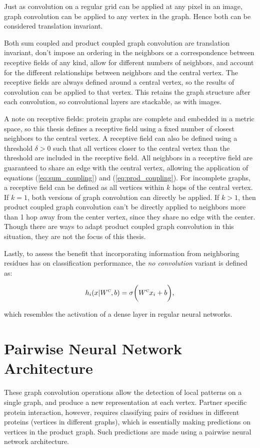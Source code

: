 Just as convolution on a regular grid can be applied at any pixel in an image, graph convolution can be applied to any vertex in the graph.
Hence both can be considered translation invariant.

Both sum coupled and product coupled graph convolution are translation invariant, don't impose an ordering in the neighbors or a correspondence between receptive fields of any kind, allow for different numbers of neighbors, and account for the different relationships between neighbors and the central vertex. 
The receptive fields are always defined around a central vertex, so the results of convolution can be applied to that vertex.
This retains the graph structure after each convolution, so convolutional layers are stackable, as with images.

A note on receptive fields: protein graphs are complete and embedded in a metric space, so this thesis defines a receptive field using a fixed number of closest neighbors to the central vertex.
A receptive field can also be defined using a threshold $\delta>0$ such that all vertices closer to the central vertex than the threshold are included in the receptive field.
All neighbors in a receptive field are guaranteed to share an edge with the central vertex, allowing the application of equations (\ref{eq:sum_coupling}) and (\ref{eq:prod_coupling}).
For incomplete graphs, a receptive field can be defined as all vertices within $k$ hops of the central vertex. 
If $k=1$, both versions of graph convolution can directly be applied.
If $k>1$, then product coupled graph convolution can't be directly applied to neighbors more than 1 hop away from the center vertex, since they share no edge with the center. 
Though there are ways to adapt product coupled graph convolution in this situation, they are not the focus of this thesis.

Lastly, to assess the benefit that incorporating information from neighboring residues has on classification performance, the \emph{no convolution} variant is defined as:

\begin{equation}
h_i(x | W^\textsc{c}, b)= \sigma \bigg( W^{\textsc{c}} x_i + b \bigg),
\label{eq:no_conv}
\end{equation}

\noindent
which resembles the activation of a dense layer in regular neural networks.


\section{Pairwise Neural Network Architecture}
These graph convolution operations allow the detection of local patterns on a single graph, and produce a new representation at each vertex.
Partner specific protein interaction, however, requires classifying pairs of residues in different proteins (vertices in different graphs), which is essentially making predictions on vertices in the product graph. 
Such predictions are made using a pairwise neural network architecture.

